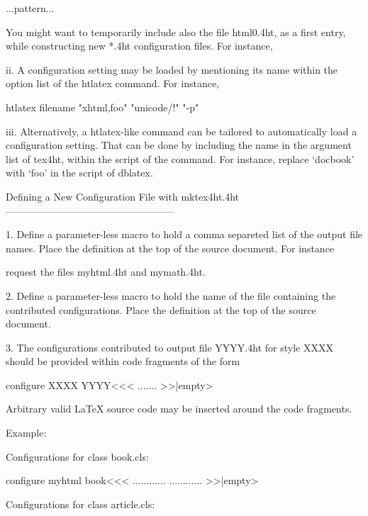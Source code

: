 {{{{\begin{tabular / array}{...pattern...}
\begin{...}
    You might want to temporarily include also the file html0.4ht, as a
    first entry, while constructing new *.4ht configuration files. For
    instance,
     
       
ii.  A configuration setting may be loaded by mentioning its name
     within the option list of the htlatex command. For instance,
      
        htlatex filename "xhtml,foo" "unicode/!" "-p"
     
iii. Alternatively, a htlatex-like command can be tailored to
     automatically load a configuration setting. That can be done
     by including  the name in the argument list of
     \csname tex4ht\endcsname,  within the script of the command. For
     instance, replace `docbook' with `foo' in the script of dblatex.


Defining a New Configuration File with mktex4ht.4ht 
---------------------------------------------------

1. Define a parameter-less macro \HTML to hold a comma separeted list
   of the output file names. Place the definition at the top of the
   source document.  For instance

         \def\HTML{myhtml,mymath}

   request the files myhtml.4ht and mymath.4ht.

2. Define a parameter-less macro \CONFIG to hold the name of the file
   containing the contributed configurations. Place the definition at
   the top of the source document.

3. The configurations contributed to output file YYYY.4ht for style
   XXXX should be provided within code fragments of the form

        \<configure XXXX YYYY\><<<
          .......
        >>|empty>

   Arbitrary valid LaTeX source code may be inserted around the code
   fragments.

    Example:

        Configurations for class book.cls:

        \<configure myhtml book\><<<
         {...}{...}{...}{...}
         {...}{...}{...}{...}
        >>|empty>

        Configurations for class article.cls:
  

\end{...}
\end{tabular / array}}}}}
